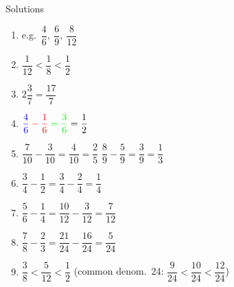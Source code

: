 \documentclass{beamer}
\begin{document}
\begin{frame}{Solutions}
\vspace{-1em}
\small
\begin{enumerate}
  \item e.g.\ $\dfrac{4}{6},\ \dfrac{6}{9},\ \dfrac{8}{12}$

  \item $\dfrac{1}{12} < \dfrac{1}{8} < \dfrac{1}{2}$

  \item $2\dfrac{3}{7} = \dfrac{17}{7}$

  \item $\color{blue}\dfrac{4}{6} \color{red}- \dfrac{1}{6} \color{green}= \dfrac{3}{6} \color{black}= \dfrac{1}{2}$

  \item $\dfrac{7}{10} - \dfrac{3}{10} = \dfrac{4}{10} = \dfrac{2}{5}$ \qquad $\dfrac{8}{9} - \dfrac{5}{9} = \dfrac{3}{9} = \dfrac{1}{3}$

  \item $\dfrac{3}{4} - \dfrac{1}{2} = \dfrac{3}{4} - \dfrac{2}{4} = \dfrac{1}{4}$

  \item $\dfrac{5}{6} - \dfrac{1}{4} = \dfrac{10}{12} - \dfrac{3}{12} = \dfrac{7}{12}$

  \item $\dfrac{7}{8} - \dfrac{2}{3} = \dfrac{21}{24} - \dfrac{16}{24} = \dfrac{5}{24}$

  \item $\dfrac{3}{8} < \dfrac{5}{12} < \dfrac{1}{2}$
  \quad (common denom.\ 24: $\dfrac{9}{24} < \dfrac{10}{24} < \dfrac{12}{24}$)
\end{enumerate}
\end{frame}
\end{document}
